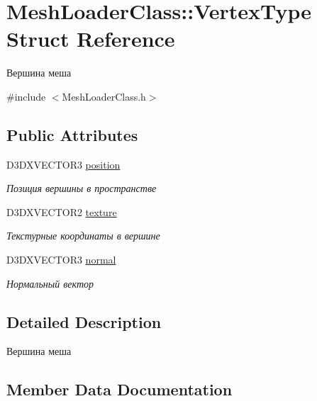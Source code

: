 \hypertarget{struct_mesh_loader_class_1_1_vertex_type}{}\section{Mesh\+Loader\+Class\+:\+:Vertex\+Type Struct Reference}
\label{struct_mesh_loader_class_1_1_vertex_type}


Вершина меша  




{\ttfamily \#include $<$Mesh\+Loader\+Class.\+h$>$}

\subsection*{Public Attributes}
\begin{DoxyCompactItemize}
\item 
D3\+D\+X\+V\+E\+C\+T\+O\+R3 \hyperlink{struct_mesh_loader_class_1_1_vertex_type_a69a2fc58d44c3760cac3754d9a126d24}{position}
\begin{DoxyCompactList}\small\item\em Позиция вершины в пространстве \end{DoxyCompactList}\item 
D3\+D\+X\+V\+E\+C\+T\+O\+R2 \hyperlink{struct_mesh_loader_class_1_1_vertex_type_aeab10e7e5c7b6b3e0142de7fccea88a2}{texture}
\begin{DoxyCompactList}\small\item\em Текстурные координаты в вершине \end{DoxyCompactList}\item 
D3\+D\+X\+V\+E\+C\+T\+O\+R3 \hyperlink{struct_mesh_loader_class_1_1_vertex_type_a9ecf06bb9fe3cd3c79cf33c4448bb3b1}{normal}
\begin{DoxyCompactList}\small\item\em Нормальный вектор \end{DoxyCompactList}\end{DoxyCompactItemize}


\subsection{Detailed Description}
Вершина меша 

\subsection{Member Data Documentation}
\mbox{\label{struct_mesh_loader_class_1_1_vertex_type_a9ecf06bb9fe3cd3c79cf33c4448bb3b1}} 
